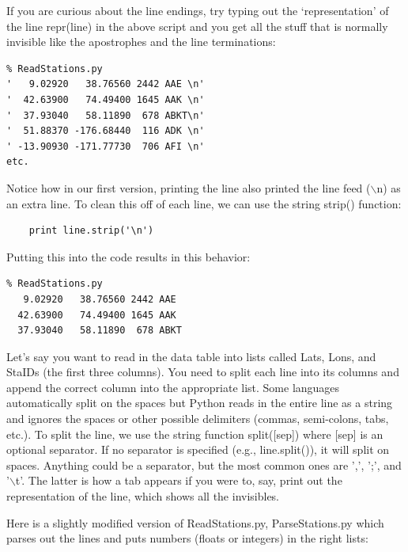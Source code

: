 \documentclass[11pt]{book}
\begin{document}
{{{If you are curious about the line endings, try typing out the `representation' of the line {\color{blue}repr(line)} in the above script and you get all the  stuff that is normally  invisible like the apostrophes and the line terminations:

{ \color{blue} \begin{verbatim}
% ReadStations.py
'   9.02920   38.76560 2442 AAE \n'
'  42.63900   74.49400 1645 AAK \n'
'  37.93040   58.11890  678 ABKT\n'
'  51.88370 -176.68440  116 ADK \n'
' -13.90930 -171.77730  706 AFI \n'
etc.
\end{verbatim}}

  
\noindent Notice how in our first version, printing the line also printed the line feed ($\backslash$n) as an extra line.  To clean this off of each line, we can use the  string {\color{blue}strip()} function:  

{ \color{blue} \begin{verbatim}
    print line.strip('\n')
\end{verbatim}}

\noindent Putting this into the code results in this behavior:

{ \color{blue} \begin{verbatim}
% ReadStations.py
   9.02920   38.76560 2442 AAE 
  42.63900   74.49400 1645 AAK 
  37.93040   58.11890  678 ABKT
\end{verbatim}}


Let's say you want to read in the data table into lists called Lats, Lons, and StaIDs (the first three columns).  You need to split each line into its columns and append the correct column into the appropriate list.  Some languages automatically split on the spaces  but Python reads in the entire line as a string and ignores the spaces or other possible delimiters (commas, semi-colons, tabs, etc.).  To split the line, we use the string function {\color{blue}split([sep])} where {\color{blue}[sep]} is an optional separator.  If no separator is specified (e.g., {\color{blue}line.split()}), it will split on spaces.   Anything could be a separator, but the most common ones are ',', ';', and '$\backslash$t'.  The latter is how a tab appears if you were to, say, print out the representation of the line, which shows all the invisibles.

Here is a slightly modified version of {\color{blue}ReadStations.py}, {\color{blue}ParseStations.py} which parses out the lines and puts numbers (floats or integers) in the right lists:

}}}
\end{document}

